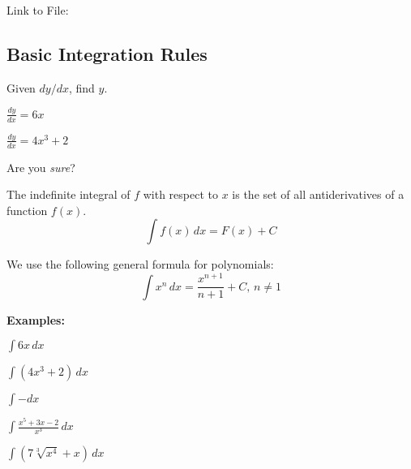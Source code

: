 \documentclass[addpoints, 12pt]{exam}
\begin{document}
\begin{center}
    Link to File:
    
    \vspace{.2cm}
    
    
\end{center}



\newpage
{}
\subsection*{Basic Integration Rules}
Given $dy/dx$, find $y$.
\begin{questions}
    \begin{minipage}{0.45\linewidth}
        \question $\displaystyle\frac{dy}{dx}=6x$
    \end{minipage}
    \hfill
    \begin{minipage}{0.45\linewidth}
        \question $\displaystyle\frac{dy}{dx}=4x^3+2$
    \end{minipage}
    
\end{questions}
Are you \textit{sure}?


\begin{tcolorbox}[title= DEFINITION OF THE INDEFINITE INTEGRAL,colframe=black,sharp corners,colback=white,colbacktitle=white,coltitle=black,boxrule=1pt]

    The indefinite integral of $f$ with respect to $x$ is the set of all antiderivatives of a function $f(x)$.
    \[\int f(x)\,dx=F(x)+C\]
    
\end{tcolorbox}

\begin{center}
    We use the following general formula for polynomials:
    \[\int x^n\,dx=\frac{x^{n+1}}{n+1}+C,\,n\ne1\]
\end{center}

\noindent\textbf{Examples:}
\begin{questions}
    \question $\displaystyle\int6x\,dx$
    
    \question $\displaystyle\int(4x^3+2)\,dx$
    
    \question $\displaystyle\int-dx$
    
    \question $\displaystyle\int\frac{x^5+3x-2}{x^3}\,dx$
    
    \newpage
    
    \question $\displaystyle\int\left(7\sqrt[3]{x^4}+x\right)\,dx$
\end{questions}
\end{document}

